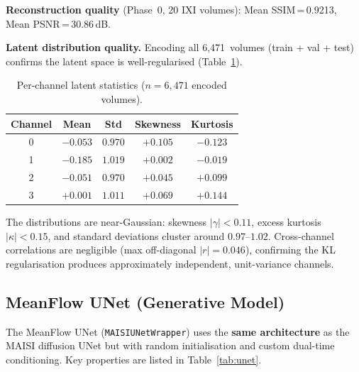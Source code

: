 \documentclass[11pt,a4paper]{article}
\newcommand{\code}[1]{\texttt{#1}}
\begin{document}
\textbf{Reconstruction quality} (Phase~0, 20 IXI volumes): Mean SSIM\,=\,0.9213,
Mean PSNR\,=\,30.86\,dB.

\textbf{Latent distribution quality.}  Encoding all 6,471~volumes (train + val
+ test) confirms the latent space is well-regularised
(Table~\ref{tab:latent_stats}).

\begin{table}[ht]
\centering
\caption{Per-channel latent statistics ($n = 6{,}471$ encoded volumes).}
\label{tab:latent_stats}
\begin{tabular}{ccccc}
\toprule
\textbf{Channel} & \textbf{Mean} & \textbf{Std} & \textbf{Skewness} & \textbf{Kurtosis} \\
\midrule
0 & $-0.053$ & $0.970$ & $+0.105$ & $-0.123$ \\
1 & $-0.185$ & $1.019$ & $+0.002$ & $-0.019$ \\
2 & $-0.051$ & $0.970$ & $+0.045$ & $+0.099$ \\
3 & $+0.001$ & $1.011$ & $+0.069$ & $+0.144$ \\
\bottomrule
\end{tabular}
\end{table}

The distributions are near-Gaussian: skewness $|\gamma| < 0.11$, excess
kurtosis $|\kappa| < 0.15$, and standard deviations cluster around
$0.97$--$1.02$.  Cross-channel correlations are negligible
(max off-diagonal $|r| = 0.046$), confirming the KL regularisation produces
approximately independent, unit-variance channels.

\subsection{MeanFlow UNet (Generative Model)}

The MeanFlow UNet (\code{MAISIUNetWrapper}) uses the \textbf{same architecture}
as the MAISI diffusion UNet but with random initialisation and custom dual-time
conditioning.  Key properties are listed in Table~\ref{tab:unet}.
\end{document}
